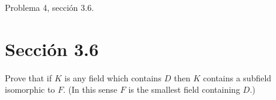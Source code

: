 





Problema 4, sección 3.6.

\section*{Sección 3.6}
\begin{problema}[Problema 4]
    Prove that if $K$ is any field which contains $D$ then $K$ contains a subfield isomorphic to $F$. (In this sense $F$ is the smallest field containing $D$.)
\end{problema}

%
%

